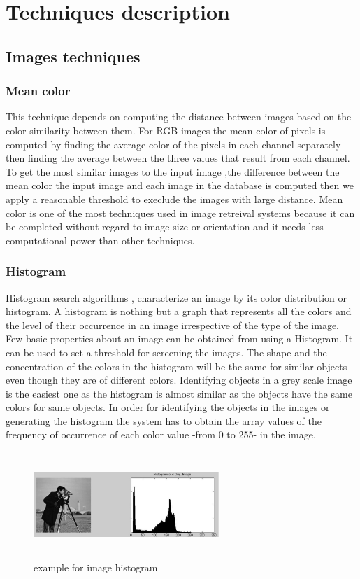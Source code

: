 \section{Techniques description}
\subsection{Images techniques}

\subsubsection{Mean color}
This technique depends on computing the distance between images based on the color similarity between them. 
For RGB images the mean color of pixels is computed by finding the average color of the pixels in each channel 
separately then finding the average between the three
values that result from each channel. To get the most similar images to the input image ,the difference between the mean color the input image 
and each image in the database is computed then we apply a reasonable threshold to execlude the images with large distance.
\vskip 0.2in
Mean color is one of the most techniques used in image retreival systems 
because it can be completed without regard to image size or orientation and it needs less computational power than other techniques.


\subsubsection{Histogram}
Histogram search algorithms , characterize an image by its
color distribution or histogram. A histogram is nothing but
a graph that represents all the colors and the level of their
occurrence in an image irrespective of the type of the
image. 
\vskip 0.2in
Few basic properties about an image can be obtained
from using a Histogram. It can be used to set a threshold for
screening the images. The shape and the concentration of
the colors in the histogram will be the same for similar
objects even though they are of different colors.
\vskip 0.2in
Identifying objects in a grey scale image is the easiest one as the
histogram is almost similar as the objects have the same
colors for same objects. In order for identifying the objects
in the images or generating the histogram the system has to
obtain the array values of the frequency of occurrence of each color value -from 0 to 255- in the image.
\vskip 0.2in

\begin{figure}[H]
    \centering
    \includegraphics[width=70mm,height=40mm]{Images/hist.png}
    \caption{example for image histogram}
  \end{figure}
\vskip 0.2in

